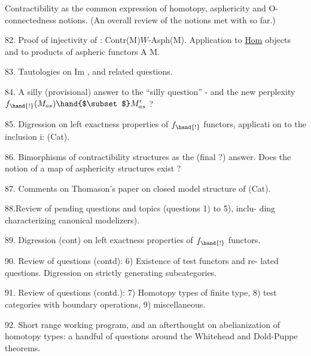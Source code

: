  Contractibility as the common expression of homotopy,  asphericity
and O-connectedness notions. (An overall review of the notions met
with so far.)

82. Proof of injectivity of \hand{$\alpha$}: Contr(M)\hand{$\hookrightarrow$}$\underline{W}$-Asph(M). Application to
\underline{Hom} objects and to products of aspheric functors A\hand{$\longrightarrow$} M.

83. Tautologies on Im \hand{$\alpha$},  and related questions.

84. A silly (provisional) answer to the ``silly question'' - and the new
perplexity  $f_{\hand{!}}(M_{as})\hand{$\subset$}M'_{as}$  ?

85. Digression on left exactness properties of $f_{\hand{!}}$ functors,  applicati
on to the inclusion i: \hand{$\Delta$}\hand{$\hookrightarrow$}(Cat).

86. Bimorphisms of contractibility structures as the (final ?) answer.
Does the notion of a map of asphericity structures exist ?

87. Comments on Thomason's paper on closed model structure of (Cat).

88.\hand{(}Review of pending questions and topics  (questions 1) to 5), inclu-%
ding characterizing canonical modelizers).

89. Digression (cont) on left exactness properties of $f_{\hand{!}}$ functors.

90. Review of questions (contd): 6) Existence of test functors and re-%
lated questions.  Digression on strictly generating subcategories.

91. Review of questions (contd.): 7) Homotopy types of finite type,
8)  test categories with boundary operations,  9) miscellaneous.

92. Short range working program,  and an afterthought on abelianization
of homotopy types:  a handful of questions around the Whitehead and
Dold-Puppe theorems. 

